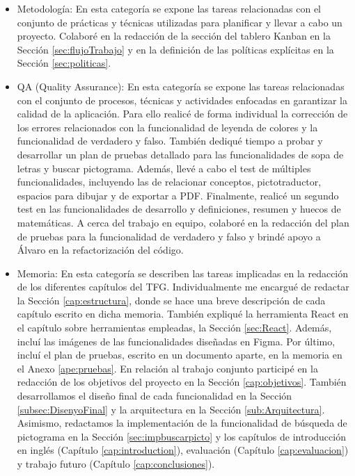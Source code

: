 \begin{itemize}
    \item Metodología: En esta categoría se expone las tareas relacionadas con el conjunto de prácticas y técnicas utilizadas para planificar y llevar a cabo un proyecto. Colaboré en la redacción de la sección del tablero Kanban en la Sección \ref{sec:flujoTrabajo} y en la definición de las políticas explícitas en la Sección \ref{sec:politicas}.
    \item QA (Quality Assurance): En esta categoría se expone las tareas relacionadas con el conjunto de procesos, técnicas y actividades enfocadas en garantizar la calidad de la aplicación. Para ello realicé de forma individual la corrección de los errores relacionados con la funcionalidad de leyenda de colores y la funcionalidad de verdadero y falso. También dediqué tiempo a probar y desarrollar un plan de pruebas detallado para las funcionalidades de sopa de letras y buscar pictograma. Además, llevé a cabo el test de múltiples funcionalidades, incluyendo las de relacionar conceptos, pictotraductor, espacios para dibujar y de exportar a PDF. Finalmente, realicé un segundo test en las funcionalidades de desarrollo y definiciones, resumen y huecos de matemáticas. A cerca del trabajo en equipo, colaboré en la redacción del plan de pruebas para la funcionalidad de verdadero y falso y brindé apoyo a Álvaro en la refactorización del código.
    \item Memoria: En esta categoría se describen las tareas implicadas en la redacción de los diferentes capítulos del TFG. Individualmente me encargué de redactar la Sección \ref{cap:estructura}, donde se hace una breve descripción de cada capítulo escrito en dicha memoria. También expliqué la herramienta React en el capítulo sobre herramientas empleadas, la Sección \ref{sec:React}. Además, incluí las imágenes de las funcionalidades diseñadas en Figma. Por último, incluí el plan de pruebas, escrito en un documento aparte, en la memoria en el Anexo \ref{ape:pruebas}. En relación al trabajo conjunto participé en la redacción de los objetivos del proyecto en la Sección \ref{cap:objetivos}. También desarrollamos el diseño final de cada funcionalidad en la Sección \ref{subsec:DisenyoFinal} y la arquitectura en la Sección \ref{sub:Arquitectura}. Asimismo, redactamos la implementación de la funcionalidad de búsqueda de pictograma en la Sección \ref{sec:impbuscarpicto} y los capítulos de introducción en inglés (Capítulo \ref{cap:introduction}), evaluación (Capítulo \ref{cap:evaluacion}) y trabajo futuro (Capítulo \ref{cap:conclusiones}).
\end{itemize}


